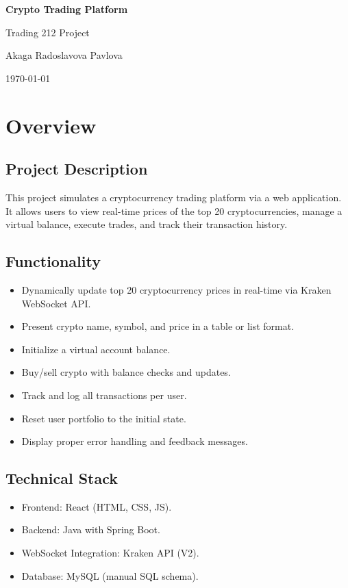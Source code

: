 \documentclass[a4paper,12pt]{article}
\begin{document}
\begin{titlepage}
    \centering
    {\huge\bfseries Crypto Trading Platform \par}
    \vspace{0.5cm}
    {\Large Trading 212 Project \par}
    \vspace{1.5cm}
    {\large Akaga Radoslavova Pavlova \par}
    \vfill
    {\large \today \par}
\end{titlepage}

\tableofcontents
\newpage

\section{Overview}
\subsection{Project Description}
This project simulates a cryptocurrency trading platform via a web application. It allows users to view real-time prices of the top 20 cryptocurrencies, manage a virtual balance, execute trades, and track their transaction history.

\subsection{Functionality}
\begin{itemize}[label=-, itemsep=0.2em]
    \item Dynamically update top 20 cryptocurrency prices in real-time via Kraken WebSocket API.
    \item Present crypto name, symbol, and price in a table or list format.
    \item Initialize a virtual account balance.
    \item Buy/sell crypto with balance checks and updates.
    \item Track and log all transactions per user.
    \item Reset user portfolio to the initial state.
    \item Display proper error handling and feedback messages.
\end{itemize}

\subsection{Technical Stack}
\begin{itemize}[label=-, itemsep=0.2em]
    \item Frontend: React (HTML, CSS, JS).
    \item Backend: Java with Spring Boot.
    \item WebSocket Integration: Kraken API (V2).
    \item Database: MySQL (manual SQL schema).
\end{itemize}
\end{document}
